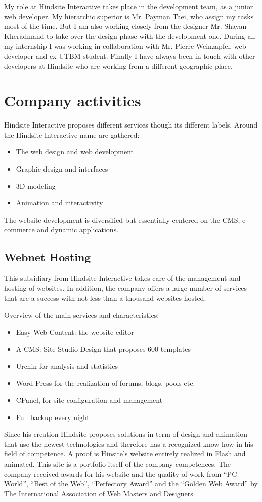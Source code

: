 My role at Hindsite Interactive takes place in the development team, as a
junior web developer. My hierarchic superior is Mr. Payman Taei, who assign
my tasks most of the time. But I am also working closely from the designer Mr.
Shayan Kheradmand to take over the design phase with the development one.
During all my internship I was working in collaboration with Mr. Pierre
Weinzapfel, web-developer and ex UTBM student.
Finally I have always been in touch with other developers at Hindsite who are
working from a different geographic place.

\section{Company activities}

Hindsite Interactive proposes different services though its different labels.
Around the Hindsite Interactive name are gathered:
\begin{itemize}
\item The web design and web development
\item Graphic design and interfaces
\item 3D modeling
\item Animation and interactivity
\end{itemize}
The website development is diversified but essentially centered on the CMS,
e-commerce and dynamic applications.

\subsection*{Webnet Hosting}

This subsidiary from Hindsite Interactive takes care of the management and
hosting of websites. In addition, the company offers a large number of
services that are a success with not less than a thousand websites hosted.

Overview of the main services and characteristics:
\begin{itemize}
\item Easy Web Content: the website editor
\item A CMS: Site Studio Design that proposes 600 templates
\item Urchin for analysis and statistics
\item Word Press for the realization of forums, blogs, pools etc.
\item CPanel, for site configuration and management
\item Full backup every night
\end{itemize}
Since his creation Hindsite proposes solutions in term of design and animation
that use the newest technologies and therefore has a recognized know-how in
his field of competence.
A proof is Hinsite’s website entirely realized in Flash and animated. This site is
a portfolio itself of the company competences.
The company received awards for his website and the quality of work from
“PC World”, “Best of the Web”, “Perfectory Award” and the “Golden Web
Award” by The International Association of Web Masters and Designers.

